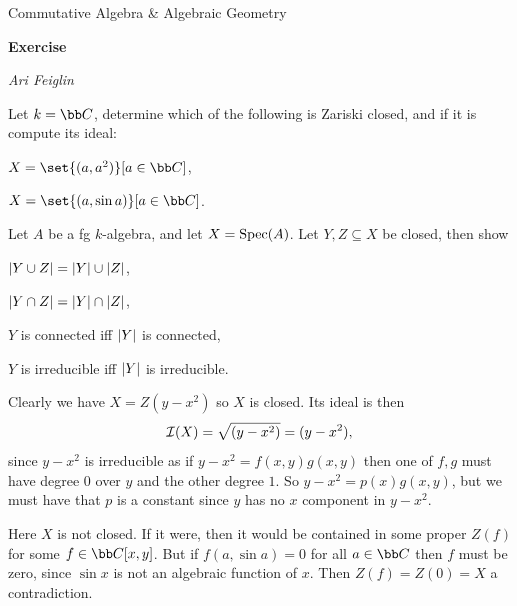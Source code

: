 


\def\enumindent{0cm}

\def\printmcount{\the\counter{section}.\the\counter{math counter}}
\setcounter{section}{7}

\centerline{Commutative Algebra \& Algebraic Geometry}
\medskip
\centerline{\bf Exercise \the{}}
\smallskip
\centerline{\it Ari Feiglin}

\bprob

    \benum
        \item Let $k=\bC$, determine which of the following is Zariski closed, and if it is compute its ideal:
        \benum
            \item $X=\set{(a,a^2)}[a\in\bC]$,
            \item $X=\set{(a,\sin a)}[a\in\bC]$.
        \eenum
        \item Let $A$ be a fg $k$-algebra, and let $X={\rm Spec}(A)$.
        Let $Y,Z\subseteq X$ be closed, then show
        \benum
            \item $\mathopen{}\mathclose{\left|Y\cup Z\right|}=\mathopen{}\mathclose{\left|Y\right|}\cup\mathopen{}\mathclose{\left|Z\right|}$,
            \item $\mathopen{}\mathclose{\left|Y\cap Z\right|}=\mathopen{}\mathclose{\left|Y\right|}\cap\mathopen{}\mathclose{\left|Z\right|}$,
            \item $Y$ is connected iff $\mathopen{}\mathclose{\left|Y\right|}$ is connected,
            \item $Y$ is irreducible iff $\mathopen{}\mathclose{\left|Y\right|}$ is irreducible.
        \eenum
    \eenum

\eprob

\benum
    \item
    \benum
        \item Clearly we have $X=Z(y-x^2)$ so $X$ is closed.
        Its ideal is then
        $$ {{\cal I}}(X) = \sqrt{(y-x^2)} = (y-x^2) , $$
        since $y-x^2$ is irreducible as if $y-x^2=f(x,y)g(x,y)$ then one of $f,g$ must have degree $0$ over $y$ and the other degree $1$.
        So $y-x^2=p(x)g(x,y)$, but we must have that $p$ is a constant since $y$ has no $x$ component in $y-x^2$.

        \item Here $X$ is not closed.
        If it were, then it would be contained in some proper $Z(f)$ for some $f\in\bC[x,y]$.
        But if $f(a,\sin a)=0$ for all $a\in\bC$ then $f$ must be zero, since $\sin x$ is not an algebraic function of $x$.
        Then $Z(f)=Z(0)=X$ a contradiction.
    \eenum

